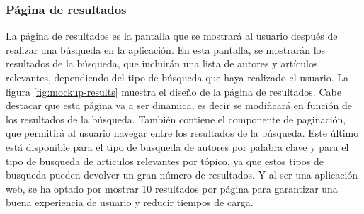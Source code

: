 \subsubsection{Página de resultados}
La página de resultados es la pantalla que se mostrará al usuario después de realizar una búsqueda en la aplicación.
En esta pantalla, se mostrarán los resultados de la búsqueda, que incluirán una lista de autores y artículos relevantes, dependiendo del tipo de búsqueda que haya realizado el usuario.
La figura \ref{fig:mockup-results} muestra el diseño de la página de resultados. Cabe destacar que esta página va a ser dinamica, es decir se modificará en función de los resultados de la búsqueda.
También contiene el componente de paginación, que permitirá al usuario navegar entre los resultados de la búsqueda. Este último está disponible para el tipo de busqueda de autores por palabra clave y para el tipo de busqueda de articulos relevantes por tópico, ya que estos tipos de busqueda pueden devolver un gran número de resultados. Y al ser una aplicación web, se ha optado por mostrar 10 resultados por página para garantizar una buena experiencia de usuario y reducir tiempos de carga.

